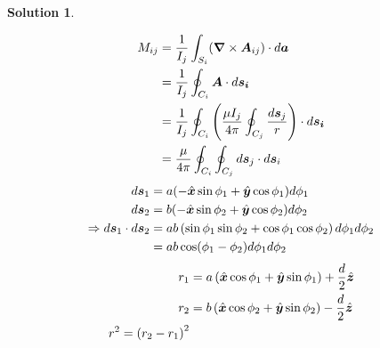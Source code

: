 \documentclass[letter,12pt]{article}
\theoremstyle{definition}
\newtheorem*{sol}{Solution}
\begin{document}
\begin{enumerate}
\begin{sol}
\begin{figure}[H]
          \end{figure}
            \begin{align*}
                M_{ij} &= \frac{1}{I_j} \int_{S_i} (\boldsymbol{\nabla} \times \boldsymbol{A}_{ij}) \cdot d\boldsymbol{a}
                \\
                &=
                \frac{1}{I_j}
                \oint_{C_i} \boldsymbol{A} \cdot d\boldsymbol{s_i}
                \\
                &=
                \frac{1}{I_j}
                \oint_{C_i}
                \left(
                    \frac{\mu I_j}{4 \pi}
                    \oint_{C_j} \frac{d\boldsymbol{s}_j}{r}
                \right)
                \cdot d\boldsymbol{s_i}
                \\
                &=
                \frac{\mu}{4 \pi} \oint_{C_i} \oint_{C_j} d\boldsymbol{s}_j \cdot d\boldsymbol{s}_i
            \end{align*}
            \begin{align*}
                d\boldsymbol{s}_1 &= a(-\hat{\boldsymbol{x}} \sin \phi_1 + \hat{\boldsymbol{y}}\cos\phi_1) d \phi_1
                \\
                d\boldsymbol{s}_2 &= b(-\hat{\boldsymbol{x}} \sin \phi_2 + \hat{\boldsymbol{y}}\cos\phi_2) d \phi_2
                \\
                \Rightarrow d\boldsymbol{s}_1 \cdot d\boldsymbol{s}_2 &=
                ab
                \left(
                    \sin \phi_1 \sin \phi_2 + \cos \phi_1 \cos \phi_2
                \right)
                d\phi_1 d\phi_2
                \\
                &= ab \cos (\phi_1 - \phi_2) d\phi_1 d\phi_2
            \end{align*}
            \begin{align*}
                r_1 &= a
                \left(
                    \hat{\bs{x}} \cos \phi_1
                    +
                    \hat{\bs{y}} \sin \phi_1
                \right)
                +
                \frac{d}{2}\hat{\bs{z}}
                \\
                r_2 &= b
                \left(
                    \hat{\bs{x}} \cos \phi_2
                    +
                    \hat{\bs{y}} \sin \phi_2
                \right)
                -
                \frac{d}{2}\hat{\bs{z}}
                \\
                r^2 = {(r_2 - r_1)}^2

\end{align*}
\end{sol}
\end{enumerate}
\end{document}
